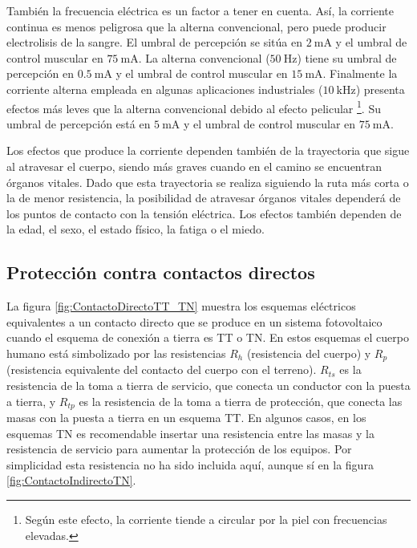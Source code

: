 También la frecuencia eléctrica es un factor a tener en cuenta. Así,
la corriente continua es menos peligrosa que la alterna convencional,
pero puede producir electrolisis de la sangre. El umbral de percepción
se sitúa en $\SI{2}{\milli\ampere}$ y el umbral de control muscular
en $\SI{75}{\milli\ampere}$. La alterna convencional ($\SI{50}{\hertz}$)
tiene su umbral de percepción en $\SI{0.5}{\milli\ampere}$ y el umbral
de control muscular en $\SI{15}{\milli\ampere}$. Finalmente la corriente
alterna empleada en algunas aplicaciones industriales ($\SI{10}{\kilo\hertz}$)
presenta efectos más leves que la alterna convencional debido al efecto
pelicular%
\footnote{Según este efecto, la corriente tiende a circular por la piel con
frecuencias elevadas.%
}. Su umbral de percepción está en $\SI{5}{\milli\ampere}$ y el umbral
de control muscular en $\SI{75}{\milli\ampere}$.

Los efectos que produce la corriente dependen también de la trayectoria
que sigue al atravesar el cuerpo, siendo más graves cuando en el camino
se encuentran órganos vitales. Dado que esta trayectoria se realiza
siguiendo la ruta más corta o la de menor resistencia, la posibilidad
de atravesar órganos vitales dependerá de los puntos de contacto con
la tensión eléctrica. Los efectos también dependen de la edad, el
sexo, el estado físico, la fatiga o el miedo. 

\subsection{Protección contra contactos directos}

La figura \ref{fig:ContactoDirectoTT_TN} muestra los esquemas eléctricos
equivalentes a un contacto directo que se produce en un sistema fotovoltaico
cuando el esquema de conexión a tierra es TT o TN. En estos esquemas
el cuerpo humano está simbolizado por las resistencias $R_{h}$
(resistencia del cuerpo) y $R_{p}$
(resistencia equivalente del contacto del cuerpo con el terreno).
$R_{ts}$
es la resistencia de la toma a tierra de servicio, que conecta un
conductor con la puesta a tierra, y $R_{tp}$
es la resistencia de la toma a tierra de protección, que conecta las
masas con la puesta a tierra en un esquema TT. En algunos casos, en
los esquemas TN es recomendable insertar una resistencia entre las
masas y la resistencia de servicio para aumentar la protección de
los equipos. Por simplicidad esta resistencia no ha sido incluida
aquí, aunque sí en la figura \ref{fig:ContactoIndirectoTN}.

